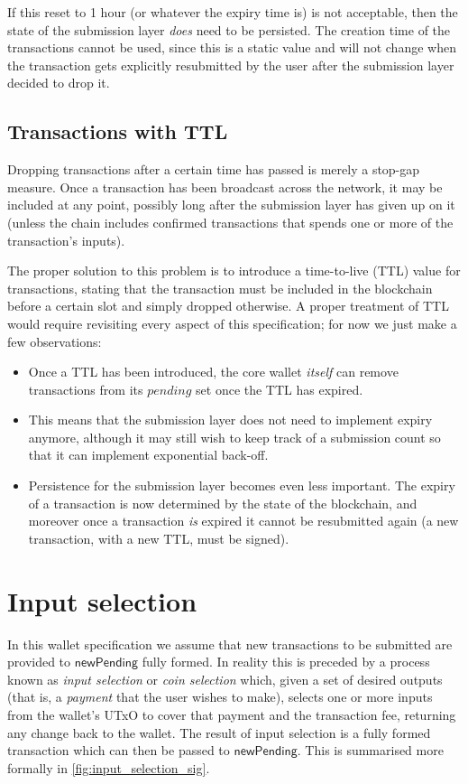 \documentclass{article}
\theoremstyle{definition}{
  \newtheorem{lemma}{Lemma}[section] %
  \newtheorem{definition}[lemma]{Definition}
}
\theoremstyle{theorem}{
  \newtheorem{invariant}[lemma]{Invariant}
  \newtheorem{proofobligation}[lemma]{Proof Obligation}
}
\numberwithin{equation}{lemma}
\begin{document}
If this reset to 1 hour (or whatever the expiry time is) is not acceptable,
then the state of the submission layer \emph{does} need to be persisted.
The creation time of the transactions cannot be used, since this is a static
value and will not change when the transaction gets explicitly resubmitted
by the user after the submission layer decided to drop it.

\subsection{Transactions with TTL}
\label{sec:TTL}

Dropping transactions after a certain time has passed is merely a stop-gap
measure. Once a transaction has been broadcast across the network, it may be
included at any point, possibly long after the submission layer has given up on
it (unless the chain includes confirmed transactions that spends one or more of
the transaction's inputs).

The proper solution to this problem is to introduce a time-to-live (TTL) value
for transactions, stating that the transaction must be included in the
blockchain before a certain slot and simply dropped otherwise. A proper treatment
of TTL would require revisiting every aspect of this specification; for now
we just make a few observations:

\begin{itemize}
\item Once a TTL has been introduced, the core wallet \emph{itself} can remove
transactions from its $\mathit{pending}$ set once the TTL has expired.
\item This means that the submission layer does not  need to implement expiry
anymore, although it may still wish to keep track of a submission count so that
it can implement exponential back-off.
\item Persistence for the submission layer becomes even less important.
The expiry of a transaction is now determined by the state of the blockchain,
and moreover once a transaction \emph{is} expired it cannot be resubmitted again
(a new transaction, with a new TTL, must be signed).
\end{itemize}

\section{Input selection}

In this wallet specification we assume that new transactions to be submitted are
provided to $\mathsf{newPending}$ fully formed. In reality this is preceded by a
process known as \emph{input selection} or \emph{coin selection} which, given a
set of desired outputs (that is, a \emph{payment} that the user wishes to make),
selects one or more inputs from the wallet's UTxO to cover that payment and the
transaction fee, returning any change back to the wallet. The result of input
selection is a fully formed transaction which can then be passed to
$\mathsf{newPending}$. This is summarised more formally in
\cref{fig:input_selection_sig}.
\end{document}
